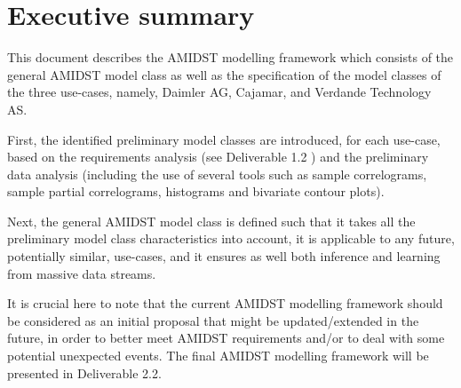 \section{Executive summary}

This document describes the AMIDST modelling framework which consists of the general AMIDST model class as well as the specification of the model classes of the three use-cases, namely, Daimler AG, Cajamar, and Verdande Technology AS.

First, the identified preliminary model classes are introduced, for each use-case, based on the requirements analysis (see Deliverable 1.2 \cite{Fer14b}) and the preliminary data analysis (including the use of several tools such as sample correlograms, sample partial correlograms, histograms and bivariate contour plots).

Next, the general AMIDST model class is defined such that it takes all the preliminary model class characteristics into account, it is applicable to any future, potentially similar, use-cases, and it ensures as well both inference and learning from massive data streams.

It is crucial here to note that the current AMIDST modelling framework should be considered as an initial proposal that might be updated/extended in the future, in order to better meet AMIDST requirements and/or to deal with some potential unexpected events. The final AMIDST modelling framework will be presented in Deliverable 2.2.
